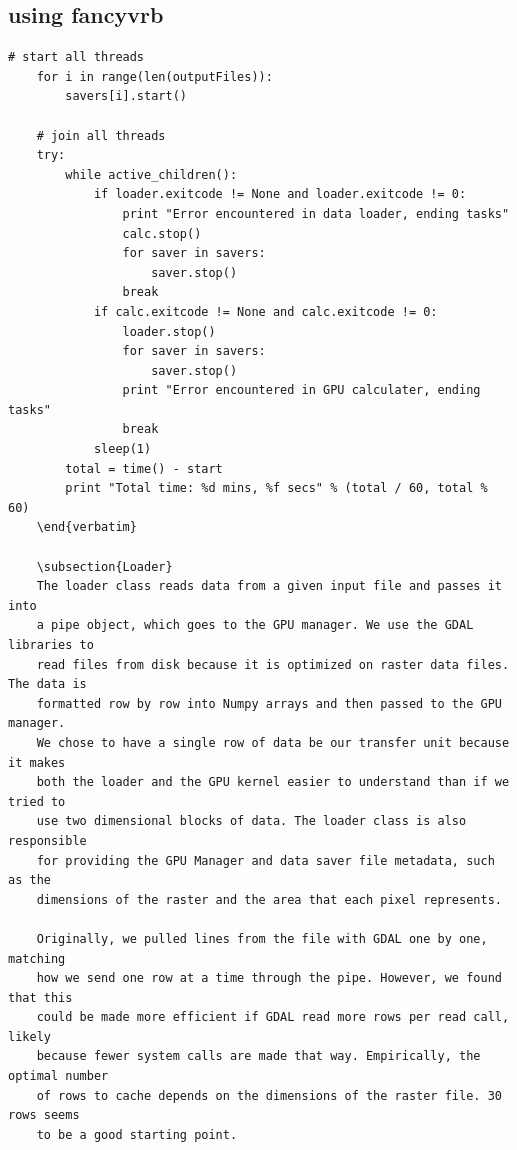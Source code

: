 \documentclass[journal]{IEEEtran}
\begin{document}
    \subsection{using fancyvrb}
    \begin{Verbatim}[frame=single]
    # start all threads
    for i in range(len(outputFiles)):
        savers[i].start()

    # join all threads
    try:
        while active_children():
            if loader.exitcode != None and loader.exitcode != 0:
                print "Error encountered in data loader, ending tasks"            
                calc.stop()
                for saver in savers:
                    saver.stop()
                break
            if calc.exitcode != None and calc.exitcode != 0:
                loader.stop()
                for saver in savers:
                    saver.stop()
                print "Error encountered in GPU calculater, ending tasks"
                break
            sleep(1)    
        total = time() - start
        print "Total time: %d mins, %f secs" % (total / 60, total % 60)
    \end{verbatim}
    
    \subsection{Loader}
    The loader class reads data from a given input file and passes it into
    a pipe object, which goes to the GPU manager. We use the GDAL libraries to
    read files from disk because it is optimized on raster data files. The data is
    formatted row by row into Numpy arrays and then passed to the GPU manager.
    We chose to have a single row of data be our transfer unit because it makes
    both the loader and the GPU kernel easier to understand than if we tried to
    use two dimensional blocks of data. The loader class is also responsible
    for providing the GPU Manager and data saver file metadata, such as the
    dimensions of the raster and the area that each pixel represents.

    Originally, we pulled lines from the file with GDAL one by one, matching
    how we send one row at a time through the pipe. However, we found that this
    could be made more efficient if GDAL read more rows per read call, likely
    because fewer system calls are made that way. Empirically, the optimal number
    of rows to cache depends on the dimensions of the raster file. 30 rows seems
    to be a good starting point.


\end{Verbatim}
\end{document}
